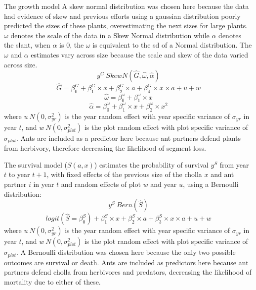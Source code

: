 \documentclass[11pt]{article}
\begin{document}
The growth model %
A skew normal distribution was chosen here because the data had evidence of skew and previous efforts using a gaussian distribution poorly predicted the sizes of these plants, overestimating the next sizes for large plants.
$\omega$ denotes the scale of the data in a Skew Normal distribution while $\alpha$ denotes the slant, when $\alpha$ is 0, the $\omega$ is equivalent to the sd of a Normal distribution. 
The $\omega$ and $\alpha$ estimates vary across size because the scale and skew of the data varied across size. 
$$y^G ~ Skew N(\hat{G},\hat{\omega},\hat{\alpha})$$
$$\hat{G} = \beta_{0}^{G} + \beta_{1}^{G} \times x + \beta_{2}^{G} \times a + \beta_{4}^{G} \times x \times a + u + w$$
$$\hat{\omega} = \beta_{0}^{\omega} + \beta_{1}^{\omega} \times x$$
$$\hat{\alpha} = \beta_{0}^{\omega} + \beta_{1}^{\omega} \times x + \beta_{2}^{\omega} \times x^2$$
where $u ~ N(0,\sigma_{yr}^{2})$ is the year random effect with year specific variance of $\sigma_{yr}$ in year $t$, and $w ~ N(0,\sigma_{plot}^{2})$ is the plot random effect with plot specific variance of $\sigma_{plot}$.
Ants are included as a predictor here because ant partners defend plants from herbivory, therefore decreasing the likelihood of segment loss.

The survival model ($S(a,x)$) estimates the probability of survival $y^S$ from year $t$ to year $t+1$, with fixed effects of the previous size of the cholla $x$ and ant partner $i$ in year $t$ and random effects of plot $w$ and year $u$, using a Bernoulli distribution:
$$y^S ~ Bern(\hat{S})$$
$$logit(\hat{S} = \beta_{0}^{S}) + \beta_{1}^{S} \times x + \beta_{2}^{S} \times a + \beta_{3}^{S} \times x \times a + u + w$$
where $u ~ N(0,\sigma_{yr}^{2})$ is the year random effect with year specific variance of $\sigma_{yr}$ in year $t$, and $w ~ N(0,\sigma_{plot}^{2})$ is the plot random effect with plot specific variance of $\sigma_{plot}$.
A Bernoulli distribution was chosen here because the only two possible outcomes are survival or death. 
Ants are included as predictors here because ant partners defend cholla from herbivores and predators, decreasing the likelihood of mortality due to either of these. 
\end{document}
